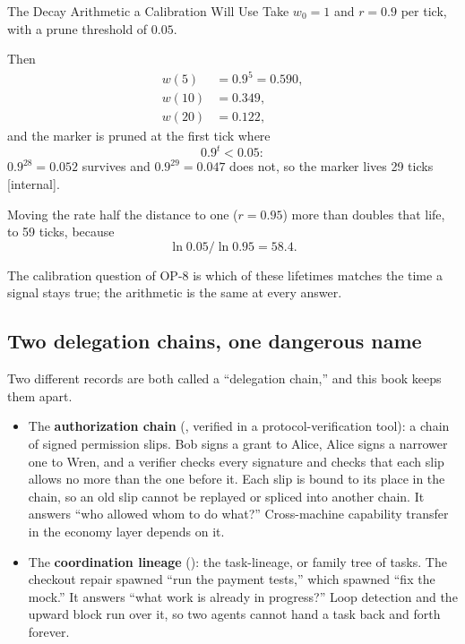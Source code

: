 \documentclass[11pt,a4paper]{article}
\theoremstyle{definition}
\theoremstyle{remark}
\begin{document}
\begin{pdexample}{The Decay Arithmetic a Calibration Will Use}
\setlength{\parskip}{4pt plus 1pt}
Take $w_0=1$ and $r=0.9$ per tick, with a prune threshold of $0.05$.

Then
\[
\begin{aligned}
w(5)&=0.9^{5}=0.590,\\
w(10)&=0.349,\\
w(20)&=0.122,
\end{aligned}
\]
and the marker is pruned at
the first tick where
\[
0.9^{t}<0.05:
\]
$0.9^{28}=0.052$ survives and
$0.9^{29}=0.047$ does not, so the marker lives 29 ticks [internal].

Moving the
rate half the distance to one ($r=0.95$) more than doubles that life, to 59
ticks, because
\[
\ln 0.05/\ln 0.95=58.4.
\]

The calibration question of OP-8 is
which of these lifetimes matches the time a signal stays true; the arithmetic is
the same at every answer.
\end{pdexample}




\subsection{Two delegation chains, one dangerous name}

Two different records are both called a ``delegation chain,'' and this book
keeps them apart.

\begin{itemize}[leftmargin=1.4em]
  \item The \textbf{authorization chain} (\Built, verified in a
  protocol-verification tool): a chain of signed permission slips. Bob signs a grant to Alice, Alice signs a narrower one to Wren, and a
  verifier checks every signature and checks that each slip allows no more than
  the one before it. Each slip is bound to its place in the chain, so an old
  slip cannot be replayed or spliced into another chain. It answers ``who
  allowed whom to do what?'' Cross-machine capability transfer in the economy
  layer depends on it.
  \item The \textbf{coordination lineage} (\Designed): the task-lineage, or
  family tree of tasks. The checkout repair spawned ``run the payment tests,'' which spawned ``fix the
  mock.'' It answers ``what work is already in progress?'' Loop detection and
  the upward block run over it, so two agents cannot hand a task back and forth
  forever.
\end{itemize}
\end{document}

